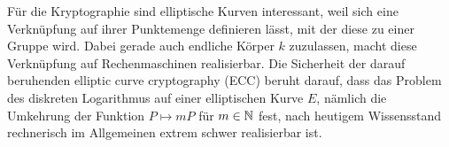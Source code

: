 Für die Kryptographie sind elliptische Kurven interessant, weil sich eine Verknüpfung auf ihrer Punktemenge definieren lässt, mit der diese zu einer Gruppe wird. 
Dabei gerade auch endliche Körper $k$ zuzulassen, macht diese Verknüpfung auf Rechenmaschinen realisierbar. 
Die Sicherheit der darauf beruhenden elliptic curve cryptography (ECC) beruht darauf, dass das Problem des diskreten Logarithmus auf einer elliptischen Kurve $E$, nämlich die Umkehrung der Funktion $P \mapsto mP$ für $m \in \mathbb{N}$ fest, nach heutigem Wissensstand rechnerisch im Allgemeinen extrem schwer realisierbar ist.
\cleardoubleoddemptypage